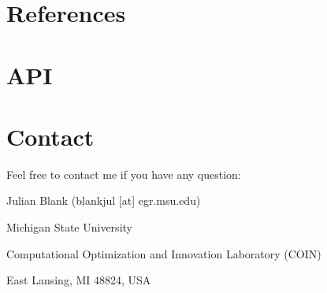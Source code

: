 \documentclass[letterpaper,10pt,english]{sphinxhowto}
\begin{document}
\begin{sphinxVerbatim}[commandchars=\\\{\}]
          \PYG{p}{[}\PYG{p}{]}
           
           
\end{sphinxVerbatim}


\section{References}
\label{\detokenize{index:references}}



\section{API}
\label{\detokenize{index:api}}

\section{Contact}
\label{\detokenize{index:contact}}
Feel free to contact me if you have any question:

\begin{DUlineblock}{0em}
\item[] Julian Blank (blankjul {[}at{]} egr.msu.edu)
\item[] Michigan State University
\item[] Computational Optimization and Innovation Laboratory (COIN)
\item[] East Lansing, MI 48824, USA
\end{DUlineblock}
\end{document}
